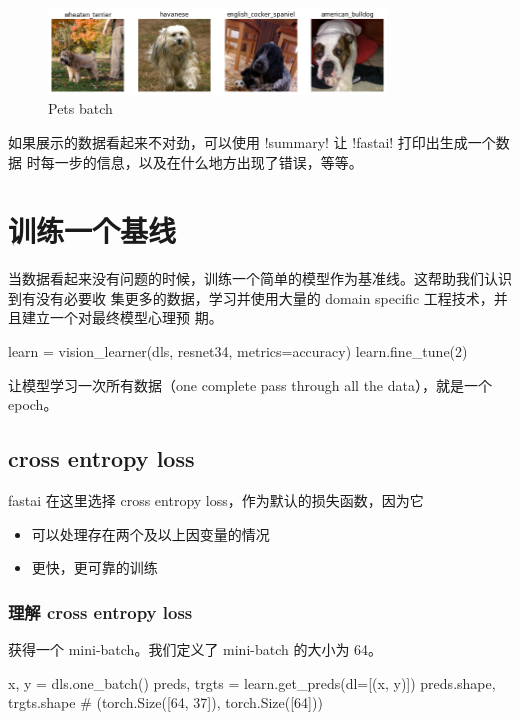 \documentclass{ctexart}
\newenvironment{monos}{\VerbatimEnvironment\begin{pythoncode}}{\end{pythoncode}}
\begin{document}
\begin{figure}[H]
    \centering
    \includegraphics[width=0.8\textwidth]{assets/pets_batch.png}
    \caption{Pets batch}
\end{figure}

如果展示的数据看起来不对劲，可以使用 \mono!summary! 让 \mono!fastai! 打印出生成一个数据
时每一步的信息，以及在什么地方出现了错误，等等。

\section{训练一个基线}

当数据看起来没有问题的时候，训练一个简单的模型作为基准线。这帮助我们认识到有没有必要收
集更多的数据，学习并使用大量的 domain specific 工程技术，并且建立一个对最终模型心理预
期。

\begin{monos}
learn = vision_learner(dls, resnet34, metrics=accuracy)
learn.fine_tune(2)
\end{monos}

让模型学习一次所有数据（one complete pass through all the data），就是一个 epoch。

\subsection{cross entropy loss}

fastai 在这里选择 cross entropy loss，作为默认的损失函数，因为它

\begin{itemize}
    \item 可以处理存在两个及以上因变量的情况
    \item 更快，更可靠的训练
\end{itemize}

\subsubsection{理解 cross entropy loss}

获得一个 mini-batch。我们定义了 mini-batch 的大小为 64。

\begin{monos}
x, y = dls.one_batch()
preds, trgts = learn.get_preds(dl=[(x, y)])
preds.shape, trgts.shape
# (torch.Size([64, 37]), torch.Size([64]))
\end{monos}
\end{document}
